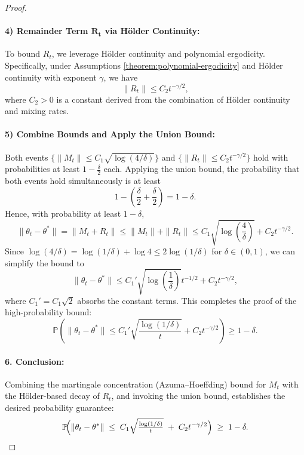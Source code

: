 \begin{proof}
\paragraph{4) Remainder Term \(\boldsymbol{R_t}\) via H\"older Continuity:}
To bound \(R_t\), we leverage H\"older continuity and polynomial ergodicity. Specifically, under Assumptions \ref{theorem:polynomial-ergodicity} and H\"older continuity with exponent \(\gamma\), we have
\[
\|R_t\| \leq C_2 t^{-\gamma/2},
\]
where \(C_2 > 0\) is a constant derived from the combination of H\"older continuity and mixing rates.

\paragraph{5) Combine Bounds and Apply the Union Bound:}
Both events \(\{\|M_t\| \leq C_1 \sqrt{\log(4/\delta)}\}\) and \(\{\|R_t\| \leq C_2 t^{-\gamma/2}\}\) hold with probabilities at least \(1 - \frac{\delta}{2}\) each. Applying the union bound, the probability that both events hold simultaneously is at least
\[
1 - \left(\frac{\delta}{2} + \frac{\delta}{2}\right) = 1 - \delta.
\]
Hence, with probability at least \(1 - \delta\),
\[
\|\theta_t - \theta^*\| = \|M_t + R_t\| \leq \|M_t\| + \|R_t\| \leq C_1 \sqrt{\log\left(\frac{4}{\delta}\right)} + C_2 t^{-\gamma/2}.
\]
Since \(\log(4/\delta) = \log(1/\delta) + \log 4 \leq 2 \log(1/\delta)\) for \(\delta \in (0,1)\), we can simplify the bound to
\[
\|\theta_t - \theta^*\| \leq C_1' \sqrt{\log\left(\frac{1}{\delta}\right)} t^{-1/2} + C_2 t^{-\gamma/2},
\]
where \(C_1' = C_1 \sqrt{2}\) absorbs the constant terms. This completes the proof of the high-probability bound:
\[
\mathbb{P}\left( \|\theta_t - \theta^*\| \leq C_1' \sqrt{\frac{\log(1/\delta)}{t}} + C_2 t^{-\gamma/2} \right) \geq 1 - \delta.
\]
\paragraph{6. Conclusion:}
Combining the martingale concentration (Azuma--Hoeffding) bound for $M_t$ with the H\"older-based decay of $R_t$, and invoking the union bound, establishes the desired probability guarantee:
\[
  \mathbb{P}\!\Bigl(
     \|\theta_t - \theta^*\|
     \;\le\;
     C_1 \sqrt{\tfrac{\log(1/\delta)}{t}}
     \;+\;
     C_2 t^{-\gamma/2}
  \Bigr)
  \;\ge\;
  1-\delta.
\]
\end{proof}
